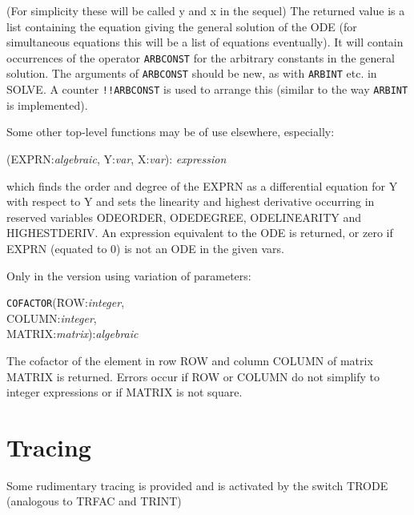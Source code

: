 \noindent (For simplicity these will be called y and x in the sequel)
The returned value is a list containing the equation giving the
general solution of the ODE (for simultaneous equations this will be a
list of equations eventually). It will contain occurrences of the
operator {\tt ARBCONST} for the arbitrary constants in the general solution.
The arguments of {\tt ARBCONST} should be new, as with {\tt ARBINT} etc.
in SOLVE. A counter {\tt !!ARBCONST} is used to arrange this (similar to the
way {\tt ARBINT} is implemented).

Some other top-level functions may be of use elsewhere, especially:

\vspace{.1in}
(EXPRN:{\em algebraic}, Y:{\em var}, X:{\em var}):
{\em expression}
\vspace{.1in}

\noindent which finds the order and degree of the EXPRN as a differential
equation for Y with respect to Y and sets the linearity and highest
derivative occurring in reserved variables ODEORDER, ODEDEGREE,
  
ODELINEARITY and HIGHESTDERIV. An expression equivalent to the ODE is
returned, or zero if EXPRN (equated to 0) is not an ODE in the
given vars.

Only in the version using variation of parameters:

\vspace{.1in}
\begin{tabbing}
{\tt COFACTOR}(\=ROW:{\em integer}, \\
\>COLUMN:{\em integer}, \\
\>MATRIX:{\em matrix}):{\em algebraic}
\end{tabbing}
\vspace{.1in}

\noindent The cofactor of the element in row ROW and column COLUMN of matrix
MATRIX is returned. Errors occur if ROW or COLUMN do not simplify to integer 
expressions  or if MATRIX is not square.

\section{Tracing}


Some rudimentary tracing is provided and is activated by the switch TRODE
(analogous to TRFAC and TRINT)

